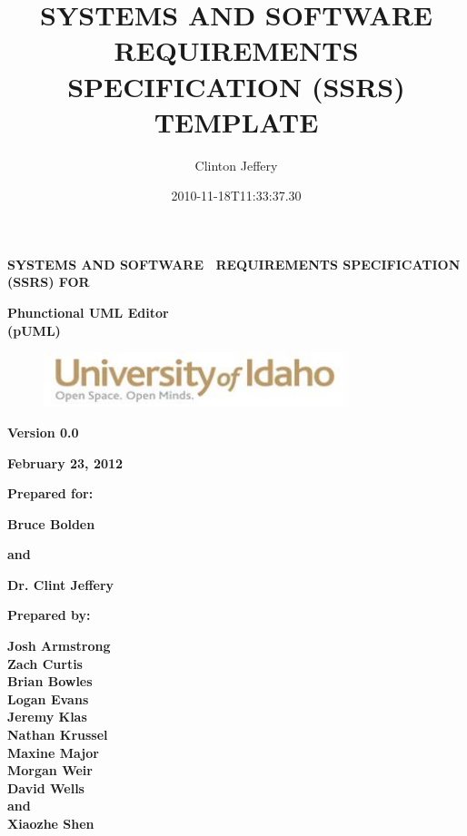 \documentclass[twoside,letterpaper]{article}
\title{SYSTEMS AND SOFTWARE REQUIREMENTS SPECIFICATION (SSRS) TEMPLATE}
\author{Clinton Jeffery}
\date{2010-11-18T11:33:37.30}
\begin{document}
\clearpage
{\centering\bfseries
SYSTEMS AND SOFTWARE \ REQUIREMENTS SPECIFICATION (SSRS) FOR
\par}


\bigskip

{\centering\bfseries
Phunctional UML Editor
\\(pUML)
\par}


\bigskip


\bigskip


\bigskip

\begin{figure}
\centering
\includegraphics[width=3.5in]{uidahologo.jpg}
\end{figure}

\bigskip


\bigskip

{\centering\bfseries
Version 0.0
\par}

{\centering\bfseries
February 23, 2012
\par}


\bigskip


\bigskip

{\centering\bfseries
Prepared for:
\par}
{\centering\bfseries
Bruce Bolden
\par}
{\centering\bfseries
and
\par}
{\centering\bfseries
Dr. Clint Jeffery
\par}

\bigskip


\bigskip

{\centering\bfseries
Prepared by:
\par}

{\centering\bfseries
Josh Armstrong
\\Zach Curtis
\\Brian Bowles
\\Logan Evans
\\Jeremy Klas
\\Nathan Krussel
\\Maxine Major
\\Morgan Weir
\\David Wells
\\and
\\Xiaozhe Shen
\par}
\end{document}
